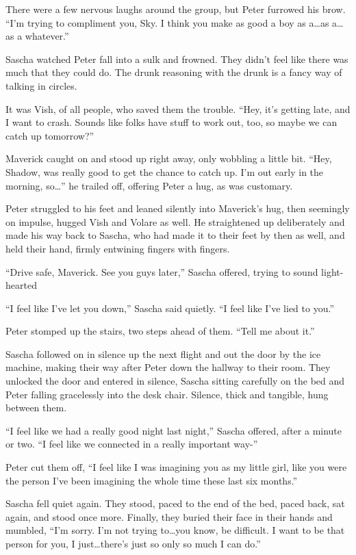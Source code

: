 There were a few nervous laughs around the group, but Peter furrowed his brow. ``I'm trying to compliment you, Sky. I think you make as good a boy as a\ldots{}as a\ldots{}as a whatever.''

Sascha watched Peter fall into a sulk and frowned. They didn't feel like there was much that they could do. The drunk reasoning with the drunk is a fancy way of talking in circles.

It was Vish, of all people, who saved them the trouble. ``Hey, it's getting late, and I want to crash. Sounds like folks have stuff to work out, too, so maybe we can catch up tomorrow?''

Maverick caught on and stood up right away, only wobbling a little bit. ``Hey, Shadow, was really good to get the chance to catch up. I'm out early in the morning, so\ldots{}'' he trailed off, offering Peter a hug, as was customary.

Peter struggled to his feet and leaned silently into Maverick's hug, then seemingly on impulse, hugged Vish and Volare as well. He straightened up deliberately and made his way back to Sascha, who had made it to their feet by then as well, and held their hand, firmly entwining fingers with fingers.

``Drive safe, Maverick. See you guys later,'' Sascha offered, trying to sound light-hearted

\secdiv

``I feel like I've let you down,'' Sascha said quietly. ``I feel like I've lied to you.''

Peter stomped up the stairs, two steps ahead of them. ``Tell me about it.''

Sascha followed on in silence up the next flight and out the door by the ice machine, making their way after Peter down the hallway to their room. They unlocked the door and entered in silence, Sascha sitting carefully on the bed and Peter falling gracelessly into the desk chair. Silence, thick and tangible, hung between them.

``I feel like we had a really good night last night,'' Sascha offered, after a minute or two. ``I feel like we connected in a really important way-''

Peter cut them off, ``I feel like I was imagining you as my little girl, like you were the person I've been imagining the whole time these last six months.''

Sascha fell quiet again. They stood, paced to the end of the bed, paced back, sat again, and stood once more. Finally, they buried their face in their hands and mumbled, ``I'm sorry. I'm not trying to\ldots{}you know, be difficult. I want to be that person for you, I just\ldots{}there's just so only so much I can do.''


